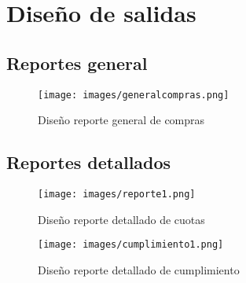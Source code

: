 \chapter{Dise\~no de salidas}
\section{Reportes general}
%
\begin{figure}[htbp]
	\centering
		\texttt{[image: images/generalcompras.png]}
	\caption{Dise\~no reporte general de compras}
	\label{fig:regeneralcompras}
\end{figure}%
\newpage%
\section{Reportes detallados}
%
\begin{figure}[htbp]
	\centering
		\texttt{[image: images/reporte1.png]}
	\caption{Dise\~no reporte detallado de cuotas}
	\label{fig:recuotas}
\end{figure}%
\newpage%
%
\begin{figure}[htbp]
	\centering
		\texttt{[image: images/cumplimiento1.png]}
	\caption{Dise\~no reporte detallado de cumplimiento}
	\label{fig:recumplimiento}
\end{figure}%
\newpage%
%